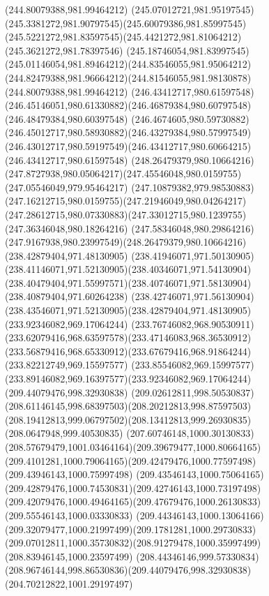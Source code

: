 {{	\moveto(244.80079388,981.99464212)
	\curveto(245.07012721,981.95197545)(245.3381272,981.90797545)(245.60079386,981.85997545)
	\curveto(245.5221272,981.83597545)(245.4421272,981.81064212)(245.3621272,981.78397546)
	\curveto(245.18746054,981.83997545)(245.01146054,981.89464212)(244.83546055,981.95064212)
	\curveto(244.82479388,981.96664212)(244.81546055,981.98130878)(244.80079388,981.99464212)
	\moveto(246.43412717,980.61597548)
	\curveto(246.45146051,980.61330882)(246.46879384,980.60797548)(246.48479384,980.60397548)
	\curveto(246.4674605,980.59730882)(246.45012717,980.58930882)(246.43279384,980.57997549)
	\curveto(246.43012717,980.59197549)(246.43412717,980.60664215)(246.43412717,980.61597548)
	\moveto(248.26479379,980.10664216)
	\curveto(247.8727938,980.05064217)(247.45546048,980.0159755)(247.05546049,979.95464217)
	\curveto(247.10879382,979.98530883)(247.16212715,980.0159755)(247.21946049,980.04264217)
	\curveto(247.28612715,980.07330883)(247.33012715,980.1239755)(247.36346048,980.18264216)
	\curveto(247.58346048,980.29864216)(247.9167938,980.23997549)(248.26479379,980.10664216)
	\moveto(238.42879404,971.48130905)
	\curveto(238.41946071,971.50130905)(238.41146071,971.52130905)(238.40346071,971.54130904)
	\curveto(238.40479404,971.55997571)(238.40746071,971.58130904)(238.40879404,971.60264238)
	\curveto(238.42746071,971.56130904)(238.43546071,971.52130905)(238.42879404,971.48130905)
	\moveto(233.92346082,969.17064244)
	\curveto(233.76746082,968.90530911)(233.62079416,968.63597578)(233.47146083,968.36530912)
	\curveto(233.56879416,968.65330912)(233.67679416,968.91864244)(233.82212749,969.15597577)
	\curveto(233.85546082,969.15997577)(233.89146082,969.16397577)(233.92346082,969.17064244)
	\moveto(209.44079476,998.32930838)
	\curveto(209.02612811,998.50530837)(208.61146145,998.68397503)(208.20212813,998.87597503)
	\curveto(208.19412813,999.06797502)(208.13412813,999.26930835)(208.0647948,999.40530835)
	\curveto(207.60746148,1000.30130833)(208.57679479,1001.03464164)(209.39679477,1000.80664165)
	\curveto(209.4101281,1000.79064165)(209.42479476,1000.77597498)(209.43946143,1000.75997498)
	\curveto(209.43546143,1000.75064165)(209.42879476,1000.74530831)(209.42746143,1000.73197498)
	\curveto(209.42079476,1000.49464165)(209.47679476,1000.26130833)(209.55546143,1000.03330833)
	\curveto(209.44346143,1000.13064166)(209.32079477,1000.21997499)(209.1781281,1000.29730833)
	\curveto(209.07012811,1000.35730832)(208.91279478,1000.35997499)(208.83946145,1000.23597499)
	\curveto(208.44346146,999.57330834)(208.96746144,998.86530836)(209.44079476,998.32930838)
	\moveto(204.70212822,1001.29197497)
}}

